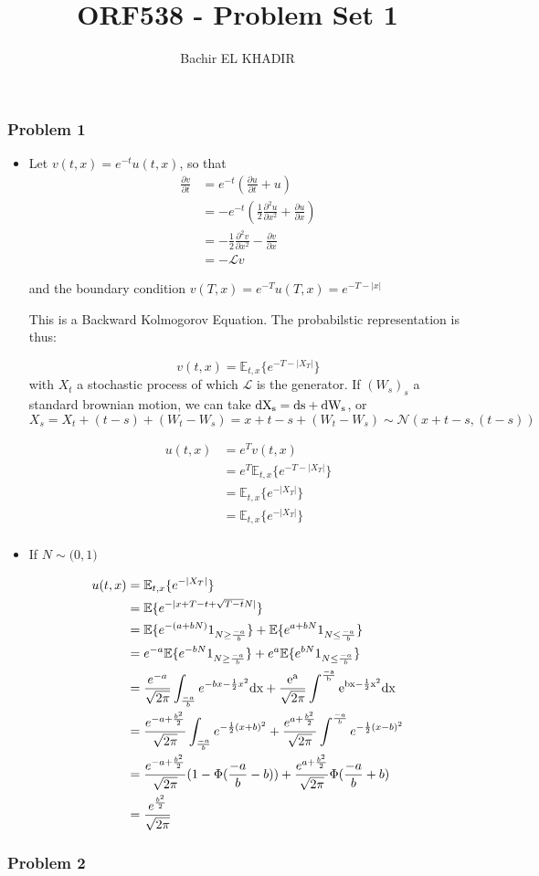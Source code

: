 \documentclass[12pt]{article}
\title{ORF538 - Problem Set 1}
\author{Bachir EL KHADIR }
\newcommand{\Q}[1]{\subsubsection*{Problem #1}}
\newcommand{\D}[2]{
\frac{\partial #1}{\partial #2}
}
\newcommand{\opL}{\mathcal{L}}
\newcommand{\dD}[2]{
\frac{\partial^2 #1}{\partial {#2}^2}
}
\begin{document}
\maketitle

\Q{1}

\begin{itemize}

\item
Let $v(t, x) = e^{-t}u(t, x)$, so that 
\begin{align}
\D v t &= e^{-t}(\D u t + u) \\
&= -e^{-t}(\frac12 \dD u x + \D u x) \\
&= -\frac12 \dD v x - \D v x \\
&= -\opL v
\end{align}

and the boundary condition $v(T, x) = e^{-T} u(T, x)= e^{-T - |x|}$

This is a Backward Kolmogorov Equation. The probabilstic representation is thus:

$$v(t, x) = \mathbb{E}_{t,x}\{ e^{-T - |X_T|}\}$$
with $X_t$ a stochastic process of which $\opL$ is the generator. If $(W_s)_s$ a standard brownian motion, we can take $\rm{d} X_s =  \rm{d}s + \rm{d}W_s$, or $X_s = X_t + (t-s) + (W_t - W_s) = x + t-s + (W_t - W_s) \sim \mathcal{N}(x+t-s, (t-s))$


\begin{align*}
u(t, x) &= e^T v(t, x) \\
&= e^T \mathbb{E}_{t,x}\{ e^{-T - |X_T|}\} \\
&= \mathbb{E}_{t,x}\{ e^{-|X_T|}\} \\
&= \mathbb{E}_{t,x}\{ e^{-|X_T|}\} \\
\end{align*}

\item

If $N \sim \mathcal(0, 1)$


\begin{align*}
u(t, x) &= \mathbb{E}_{t,x}\{ e^{-|X_T|}\} \\
&= \mathbb{E}\{ e^{-|x + T - t + \sqrt{T-t} N |}\} \\
&= \mathbb{E}\{ e^{-(a + b N)} 1_{N \geq \frac{-a} b} \} + \mathbb{E}\{ e^{a + b N} 1_{N \leq \frac{-a}b} \} \\
&= e^{-a}\mathbb{E}\{ e^{- b N} 1_{N \geq \frac{-a}b}\} +
e^{a} \mathbb{E}\{ e^{b N} 1_{N \leq \frac{-a}b} \} \\
&= \frac{e^{-a}}{\sqrt{2\pi}} \int_{\frac{-a}b}  e^{-b x-\frac12 x^2} \rm{d}x +
\frac{e^a}{\sqrt{2\pi}} \int^{\frac{-a}b}  e^{b x-\frac12 x^2} \rm{d}x \\
&= \frac{e^{-a+\frac{b^2} 2}}{\sqrt{2\pi}} \int_{\frac{-a}b}  e^{-\frac12 (x+b)^2} 
+ \frac{e^{a+\frac{b^2} 2}}{\sqrt{2\pi}} \int^{\frac{-a}b}  e^{-\frac12 (x-b)^2} \\
&= \frac{e^{-a+\frac{b^2} 2}}{\sqrt{2\pi}} (1-\Phi(\frac{-a}{b}-b))
+ \frac{e^{a+\frac{b^2} 2}}{\sqrt{2\pi}} \Phi(\frac{-a}{b}+b)\\
&= \frac{e^{\frac{b^2} 2}}{\sqrt{2\pi}}
\end{align*}

\end{itemize}


\Q{2}
\end{document}

